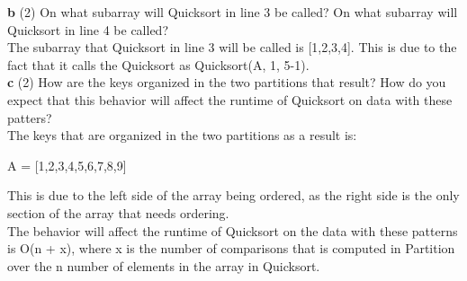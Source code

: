 \documentclass[12pt]{article}
\begin{document}
\linebreak
\textbf{b} (2) On what subarray will Quicksort in line 3 be called? On what subarray will Quicksort in line 4 be called? \\
\linebreak
The subarray that Quicksort in line 3 will be called is [1,2,3,4]. This is due to the fact that it calls the Quicksort as Quicksort(A, 1, 5-1). \\
\linebreak
\textbf{c} (2) How are the keys organized in the two partitions that result? How do you expect that this behavior will affect the runtime of Quicksort on data with these patters? \\
The keys that are organized in the two partitions as a result is: \\
\begin{center}
A = [1,2,3,4,5,6,7,8,9] \\
\end{center}
This is due to the left side of the array being ordered, as the right side is the only section of the array that needs ordering. \\
\linebreak
The behavior will affect the runtime of Quicksort on the data with these patterns is O(n + x), where x is the number of comparisons that is computed in Partition over the n number of elements in the array in Quicksort. \\
\end{document}
